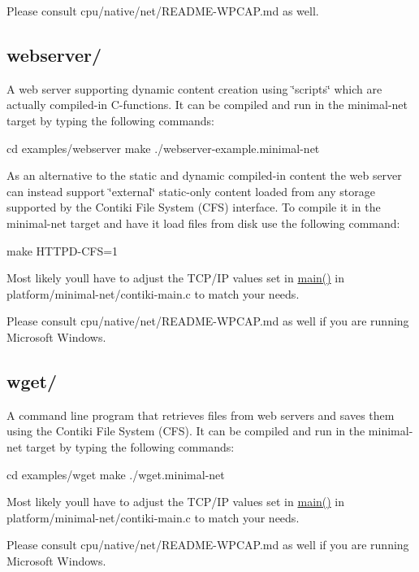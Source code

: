 Please consult cpu/native/net/\+R\+E\+A\+D\+M\+E-\/\+W\+P\+C\+A\+P.\+md as well.

\subsection*{webserver/ }

A web server supporting dynamic content creation using \char`\"{}scripts\char`\"{} which are actually compiled-\/in C-\/functions. It can be compiled and run in the \textquotesingle{}minimal-\/net\textquotesingle{} target by typing the following commands\+: \begin{DoxyVerb}cd examples/webserver
make
./webserver-example.minimal-net
\end{DoxyVerb}


As an alternative to the static and dynamic compiled-\/in content the web server can instead support \char`\"{}external\char`\"{} static-\/only content loaded from any storage supported by the \textquotesingle{}Contiki File System\textquotesingle{} (C\+F\+S) interface. To compile it in the \textquotesingle{}minimal-\/net\textquotesingle{} target and have it load files from disk use the following command\+: \begin{DoxyVerb}make HTTPD-CFS=1
\end{DoxyVerb}


Most likely you\textquotesingle{}ll have to adjust the T\+C\+P/\+I\+P values set in \hyperlink{group__IPV6_ga0c99d968a34e803d378692bde2e3f18f}{main()} in platform/minimal-\/net/contiki-\/main.\+c to match your needs.

Please consult cpu/native/net/\+R\+E\+A\+D\+M\+E-\/\+W\+P\+C\+A\+P.\+md as well if you are running Microsoft Windows.

\subsection*{wget/ }

A command line program that retrieves files from web servers and saves them using the \textquotesingle{}Contiki File System\textquotesingle{} (C\+F\+S). It can be compiled and run in the \textquotesingle{}minimal-\/net\textquotesingle{} target by typing the following commands\+: \begin{DoxyVerb}cd examples/wget
make
./wget.minimal-net
\end{DoxyVerb}


Most likely you\textquotesingle{}ll have to adjust the T\+C\+P/\+I\+P values set in \hyperlink{group__IPV6_ga0c99d968a34e803d378692bde2e3f18f}{main()} in platform/minimal-\/net/contiki-\/main.\+c to match your needs.

Please consult cpu/native/net/\+R\+E\+A\+D\+M\+E-\/\+W\+P\+C\+A\+P.\+md as well if you are running Microsoft Windows. 